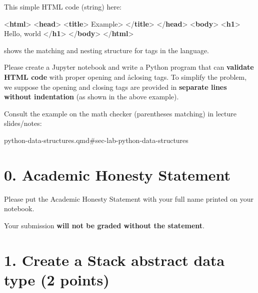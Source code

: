 \documentclass[
  letterpaper,
]{scrbook}
\newenvironment{Shaded}{\begin{snugshade}}{\end{snugshade}}
\newcommand{\DataTypeTok}[1]{\textcolor[rgb]{0.68,0.00,0.00}{#1}}
\newcommand{\KeywordTok}[1]{\textcolor[rgb]{0.00,0.23,0.31}{\textbf{#1}}}
\newcommand{\NormalTok}[1]{\textcolor[rgb]{0.00,0.23,0.31}{#1}}
\begin{document}
This simple HTML code (string) here:

\begin{Shaded}
\begin{Highlighting}[]
\DataTypeTok{\textless{}}\KeywordTok{html}\DataTypeTok{\textgreater{}}
\DataTypeTok{\textless{}}\KeywordTok{head}\DataTypeTok{\textgreater{}}
\DataTypeTok{\textless{}}\KeywordTok{title}\DataTypeTok{\textgreater{}}
\NormalTok{Example\textgreater{}}
\DataTypeTok{\textless{}/}\KeywordTok{title}\DataTypeTok{\textgreater{}}
\DataTypeTok{\textless{}/}\KeywordTok{head}\DataTypeTok{\textgreater{}}
\DataTypeTok{\textless{}}\KeywordTok{body}\DataTypeTok{\textgreater{}}
\DataTypeTok{\textless{}}\KeywordTok{h1}\DataTypeTok{\textgreater{}}
\NormalTok{Hello, world}
\DataTypeTok{\textless{}/}\KeywordTok{h1}\DataTypeTok{\textgreater{}}
\DataTypeTok{\textless{}/}\KeywordTok{body}\DataTypeTok{\textgreater{}}
\DataTypeTok{\textless{}/}\KeywordTok{html}\DataTypeTok{\textgreater{}}
\end{Highlighting}
\end{Shaded}

shows the matching and nesting structure for tags in the language.

Please create a Jupyter notebook and write a Python program that can
\textbf{validate HTML code} with proper opening and åclosing tags. To
simplify the problem, we suppose the opening and closing tags are
provided in \textbf{separate lines without indentation} (as shown in the
above example).

Consult the example on the math checker (parentheses matching) in
lecture slides/notes:

python-data-structures.qmd\#sec-lab-python-data-structures

\section*{0. Academic Honesty
Statement}\label{academic-honesty-statement}


Please put the Academic Honesty Statement with your full name printed on
your notebook.

Your submission \textbf{will not be graded without the statement}.

\section*{1. Create a Stack abstract data type (2
points)}\label{create-a-stack-abstract-data-type-2-points}
\end{document}
